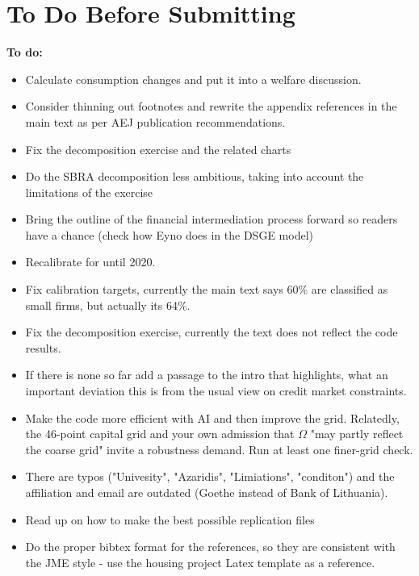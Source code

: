 \documentclass[12pt]{article}
\begin{document}
\newpage

\section*{To Do Before Submitting}

\noindent \textbf{To do:}
\begin{itemize} \setlength\itemsep{0em}  \small
    \item Calculate consumption changes and put it into a welfare discussion.
    \item Consider thinning out footnotes and rewrite the appendix references in the main text as per AEJ publication recommendations.
    \item Fix the decomposition exercise and the related charts
    \item Do the SBRA decomposition less ambitious, taking into account the limitations of the exercise
    \item Bring the outline of the financial intermediation process forward so readers have a chance (check how Eyno does in the DSGE model)
    \item Recalibrate for until 2020.
    \item Fix calibration targets, currently the main text says 60\% are classified as small firms, but actually its 64\%.
    \item Fix the decomposition exercise, currently the text does not reflect the code results. 
    \item If there is none so far add a passage to the intro that highlights, what an important deviation this is from the usual view on credit market constraints.
    \item Make the code more efficient with AI and then improve the grid. Relatedly, the 46-point capital grid and your own admission that $\Omega$ "may partly reflect the coarse grid" invite a robustness demand. Run at least one finer-grid check.
    \item There are typos ("Univesity", "Azaridis", "Limiations", "conditon") and the affiliation and email are outdated (Goethe instead of Bank of Lithuania).    
    \item Read up on how to make the best possible replication files
    \item Do the proper bibtex format for the references, so they are consistent with the JME style - use the housing project Latex template as a reference.
\end{itemize} \normalsize
\end{document}

